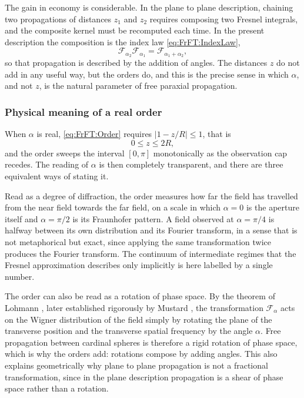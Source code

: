 			The gain in economy is considerable. In the plane to plane description, chaining two propagations of distances $z_{1}$ and $z_{2}$ requires composing two Fresnel integrals, and the composite kernel must be recomputed each time. In the present description the composition is the index law \eqref{eq:FrFT:IndexLaw},
			\begin{equation}\label{eq:FrFT:Chaining}
				\mathcal{F}_{\alpha_{2}}\mathcal{F}_{\alpha_{1}} = \mathcal{F}_{\alpha_{1}+\alpha_{2}},
			\end{equation}
			so that propagation is described by the addition of angles. The distances $z$ do not add in any useful way, but the orders do, and this is the precise sense in which $\alpha$, and not $z$, is the natural parameter of free paraxial propagation.

		\subsubsection{Physical meaning of a real order}

			When $\alpha$ is real, \eqref{eq:FrFT:Order} requires $\left|1-z/R\right|\leq 1$, that is
			\begin{equation}\label{eq:FrFT:RealRange}
				0 \leq z \leq 2R,
			\end{equation}
			and the order sweeps the interval $[0,\pi]$ monotonically as the observation cap recedes. The reading of $\alpha$ is then completely transparent, and there are three equivalent ways of stating it.

			Read as a degree of diffraction, the order measures how far the field has travelled from the near field towards the far field, on a scale in which $\alpha = 0$ is the aperture itself and $\alpha = \pi/2$ is its Fraunhofer pattern. A field observed at $\alpha = \pi/4$ is halfway between its own distribution and its Fourier transform, in a sense that is not metaphorical but exact, since applying the same transformation twice produces the Fourier transform. The continuum of intermediate regimes that the Fresnel approximation describes only implicitly is here labelled by a single number.

			The order can also be read as a rotation of phase space. By the theorem of Lohmann \citeyearpar{lohmann1993image}, later established rigorously by Mustard \citeyearpar{mustard1996fractional}, the transformation $\mathcal{F}_{\alpha}$ acts on the Wigner distribution of the field simply by rotating the plane of the transverse position and the transverse spatial frequency by the angle $\alpha$. Free propagation between cardinal spheres is therefore a rigid rotation of phase space, which is why the orders add: rotations compose by adding angles. This also explains geometrically why plane to plane propagation is not a fractional transformation, since in the plane description propagation is a shear of phase space rather than a rotation.

